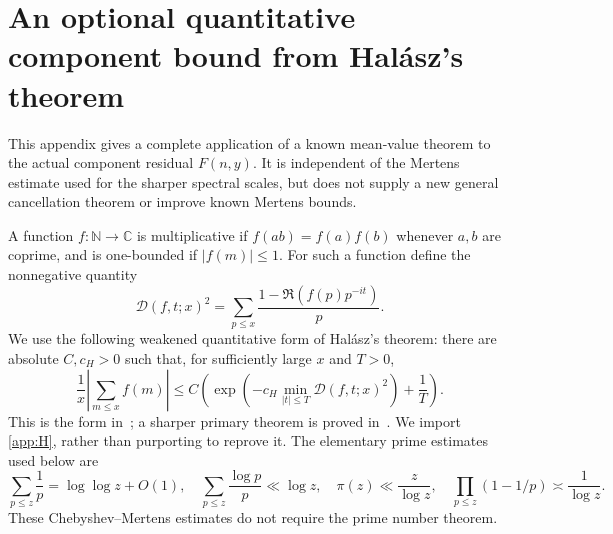 \section{An optional quantitative component bound from Hal\'asz's theorem}\label{app:halasz}

This appendix gives a complete application of a known mean-value theorem to the actual component residual $F(n,y)$. It is independent of the Mertens estimate used for the sharper spectral scales, but does not supply a new general cancellation theorem or improve known Mertens bounds.

A function $f:\mathbb N\to\mathbb C$ is multiplicative if $f(ab)=f(a)f(b)$ whenever $a,b$ are coprime, and is one-bounded if $|f(m)|\le1$. For such a function define the nonnegative quantity
\[
 \mathcal D(f,t;x)^2=\sum_{p\le x}\frac{1-\Re(f(p)p^{-it})}{p}.
\]
We use the following weakened quantitative form of Hal\'asz's theorem: there are absolute $C,c_H>0$ such that, for sufficiently large $x$ and $T>0$,
\begin{equation}\label{app:H}
 \frac1x\left|\sum_{m\le x}f(m)\right|
 \le C\left(\exp\left(-c_H\min_{|t|\le T}\mathcal D(f,t;x)^2\right)+\frac1T\right).
\end{equation}
This is the form in~\cite[Theorem~7]{taohalasz}; a sharper primary theorem is proved in~\cite{ghs}. We import \eqref{app:H}, rather than purporting to reprove it. The elementary prime estimates used below are
\[
 \sum_{p\le z}\frac1p=\log\log z+O(1),\quad
 \sum_{p\le z}\frac{\log p}{p}\ll\log z,\quad
 \pi(z)\ll\frac z{\log z},\quad
 \prod_{p\le z}(1-1/p)\asymp\frac1{\log z}.
\]
These Chebyshev--Mertens estimates do not require the prime number theorem.

